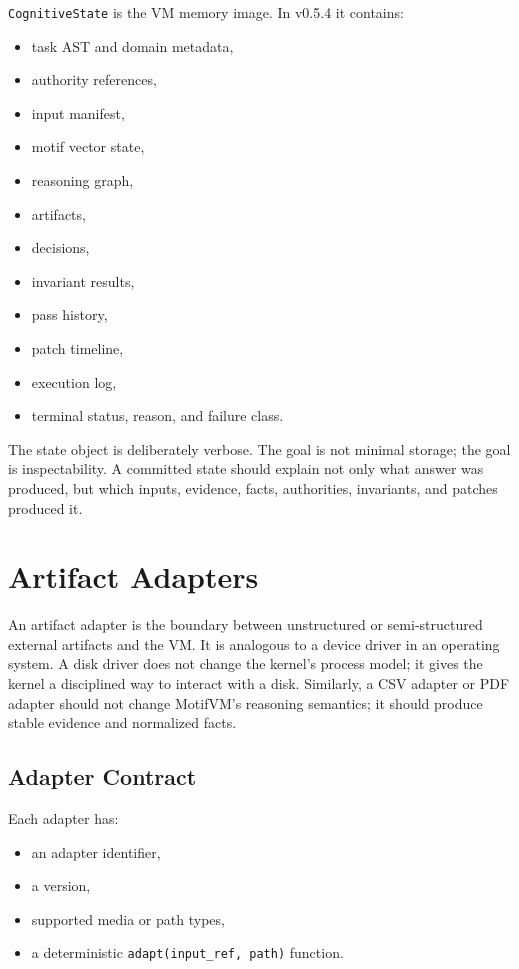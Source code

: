 \documentclass[11pt]{article}
\begin{document}
\texttt{CognitiveState} is the VM memory image. In v0.5.4 it contains:

\begin{itemize}[leftmargin=1.5em]
  \item task AST and domain metadata,
  \item authority references,
  \item input manifest,
  \item motif vector state,
  \item reasoning graph,
  \item artifacts,
  \item decisions,
  \item invariant results,
  \item pass history,
  \item patch timeline,
  \item execution log,
  \item terminal status, reason, and failure class.
\end{itemize}

The state object is deliberately verbose. The goal is not minimal storage; the goal is inspectability. A committed state should explain not only what answer was produced, but which inputs, evidence, facts, authorities, invariants, and patches produced it.

\section{Artifact Adapters}

An artifact adapter is the boundary between unstructured or semi-structured external artifacts and the VM. It is analogous to a device driver in an operating system. A disk driver does not change the kernel's process model; it gives the kernel a disciplined way to interact with a disk. Similarly, a CSV adapter or PDF adapter should not change MotifVM's reasoning semantics; it should produce stable evidence and normalized facts.

\subsection{Adapter Contract}

Each adapter has:

\begin{itemize}[leftmargin=1.5em]
  \item an adapter identifier,
  \item a version,
  \item supported media or path types,
  \item a deterministic \texttt{adapt(input\_ref, path)} function.
\end{itemize}
\end{document}
